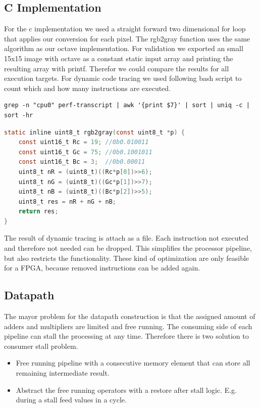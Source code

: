 \documentclass[a4paper]{scrartcl}
\begin{document}
\subsection{C Implementation}

For the c implementation we used a straight forward two dimensional for loop that applies our conversion for each pixel. The rgb2gray function uses the same algorithm as our octave implementation. For validation we exported an small 15x15 image with octave as a constant static input array and printing the resulting array with printf. Therefor we could compare the results for all execution targets. For dynamic code tracing we used following bash script to count which and how many instructions are executed.

\begin{minipage}{\linewidth}

\begin{lstlisting}
grep -n "cpu0" perf-transcript | awk '{print $7}' | sort | uniq -c | sort -hr
\end{lstlisting}
\end{minipage}

\begin{minipage}{\linewidth}
\begin{lstlisting}[language=C]
static inline uint8_t rgb2gray(const uint8_t *p) {
	const uint16_t Rc = 19; //0b0.010011
	const uint16_t Gc = 75; //0b0.1001011
	const uint16_t Bc = 3;  //0b0.00011
	uint8_t nR = (uint8_t)((Rc*p[0])>>6);
	uint8_t nG = (uint8_t)((Gc*p[1])>>7);
	uint8_t nB = (uint8_t)((Bc*p[2])>>5);
	uint8_t res = nR + nG + nB;
	return res;
}
\end{lstlisting}
\end{minipage}

The result of dynamic tracing is attach as a file. Each instruction not executed and therefore not needed can be dropped. This simplifies the processor pipeline, but also restricts the functionality. These kind of optimization are only feasible for a FPGA, because removed instructions can be added again. 

\subsection{Datapath}
The mayor problem for the datapath construction is that the assigned amount of adders and multipliers are limited and free running. The consuming side of each pipeline can stall the processing at any time. Therefore there is two solution to consumer stall problem.
\begin{itemize}
	\item Free running pipeline with a consecutive memory element that can store all remaining intermediate result.
	
	\item Abstract the free running operators with a restore after stall logic. E.g. during a stall feed values in a cycle.  
\end{itemize}
\end{document}
